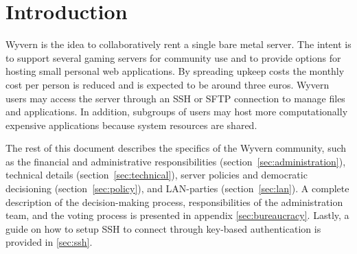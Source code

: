 \section{Introduction}
Wyvern is the idea to collaboratively rent a single bare metal server. The intent is to support several gaming servers for community use and to provide options for hosting small personal web applications. By spreading upkeep costs the monthly cost per person is reduced and is expected to be around three euros. Wyvern users may access the server through an SSH or SFTP connection to manage files and applications. In addition, subgroups of users may host more computationally expensive applications because system resources are shared.

The rest of this document describes the specifics of the Wyvern community, such as the financial and administrative responsibilities (section~\ref{sec:administration}), technical details (section~\ref{sec:technical}), server policies and democratic decisioning (section~\ref{sec:policy}), and LAN-parties (section~\ref{sec:lan}). A complete description of the decision-making process, responsibilities of the administration team, and the voting process is presented in appendix \ref{sec:bureaucracy}. Lastly, a guide on how to setup SSH to connect through key-based authentication is provided in \ref{sec:ssh}.
